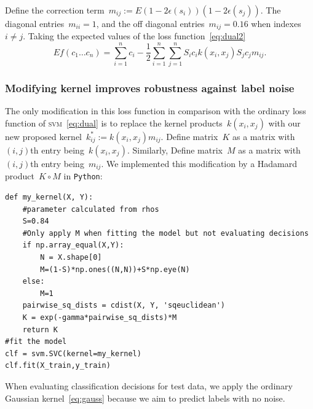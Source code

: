 \documentclass[12pt]{article} %
\newcommand{\svm}{\textsc{svm}}
\begin{document}
Define the correction term~$m_{ij}:=E(1-2\epsilon(s_i))(1-2\epsilon(s_j))$. The diagonal entries~$m_{ii}=1$, and the off diagonal entries~$m_{ij}=0.16$ when indexes~$i\neq j$. Taking the expected values of the loss function~\eqref{eq:dual2}
\begin{equation}
   Ef(c_{1}\ldots c_{n})=\sum _{i=1}^{n}c_{i}-{\frac {1}{2}}\sum _{i=1}^{n}\sum _{j=1}^{n}S_{i}c_{i}k(x_{i},x_{j})S_{j}c_{j}m_{ij}. \label{eq:dual3}
\end{equation}

\subsubsection{Modifying kernel improves robustness against label noise} \label{sec:mod}

The only modification in this loss function in comparison with the ordinary loss function of \svm\ \eqref{eq:dual} is to replace the kernel products~$k(x_i,x_j)$ with our new proposed kernel~$k^*_{ij}:=k(x_i,x_j)m_{ij}$. Define matrix~$K$ as a matrix with $(i,j)$th entry being~$k(x_i,x_j)$. Similarly, Define matrix~$M$ as a matrix with $(i,j)$th entry being~$m_{ij}$. We implemented this modification by a Hadamard product~$K\circ M$ in \texttt{Python}:
\begin{lstlisting}[caption=Customised kernel for Expectation Maximisation algorithm, label=matn1]
def my_kernel(X, Y):
    #parameter calculated from rhos  
    S=0.84
    #Only apply M when fitting the model but not evaluating decisions
    if np.array_equal(X,Y):
        N = X.shape[0]
        M=(1-S)*np.ones((N,N))+S*np.eye(N)
    else:
        M=1    
    pairwise_sq_dists = cdist(X, Y, 'sqeuclidean')
    K = exp(-gamma*pairwise_sq_dists)*M
    return K
#fit the model
clf = svm.SVC(kernel=my_kernel)
clf.fit(X_train,y_train)
\end{lstlisting}
When evaluating classification decisions for test data, we apply the ordinary Gaussian kernel~\eqref{eq:gauss} because we aim to predict labels with no noise. 
\end{document}
